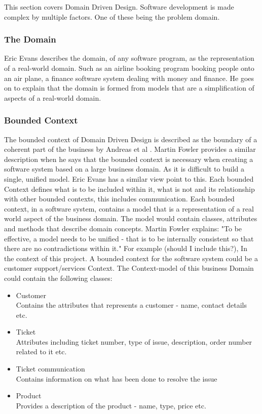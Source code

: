 This section covers Domain Driven Design. Software development is made complex by multiple factors. One of these being the problem domain. 
\subsubsection{The Domain}
Eric Evans \cite{EvansDDD} describes the domain, of any software program, as the representation of a real-world domain. Such as an airline booking program booking people onto an air plane, a finance software system dealing with money and finance. He goes on to explain that the domain is formed from models that are a simplification of aspects of a real-world domain.

\subsubsection{Bounded Context}
The bounded context of Domain Driven Design is described as the boundary of a coherent part of the business by Andreas et al \cite{mci/Diepenbrock2017}. Martin Fowler \cite{MFowlerDDD} provides a similar description when he says that the bounded context is necessary when creating a software system based on a large business domain. As it is difficult to build a single, unified model. Eric Evans \cite{EvansDDD} has a similar view point to this.
Each bounded Context defines what is to be included within it, what is not and its relationship with other bounded contexts, this includes communication. Each bounded context, in a software system, contains a model that is a representation of a real world aspect of the business domain. The model would contain classes, attributes and methods that describe domain concepts. Martin Fowler explains: "To be effective, a model needs to be unified - that is to be internally consistent so that there are no contradictions within it." \cite{MFowlerDDD}
For example (should I include this?), In the context of this project. A bounded context for the software system could be a customer support/services Context. The Context-model of this business Domain could contain the following classes:
\begin{itemize}
	\item Customer 
	\\ Contains the attributes that represents a customer - name, contact details etc. 
	\item Ticket
	\\ Attributes including ticket number, type of issue, description, order number related to it etc.
	\item Ticket communication
	\\ Contains information on what has been done to resolve the issue 
	\item Product
	\\ Provides a description of the product - name, type, price etc.
\end{itemize}
